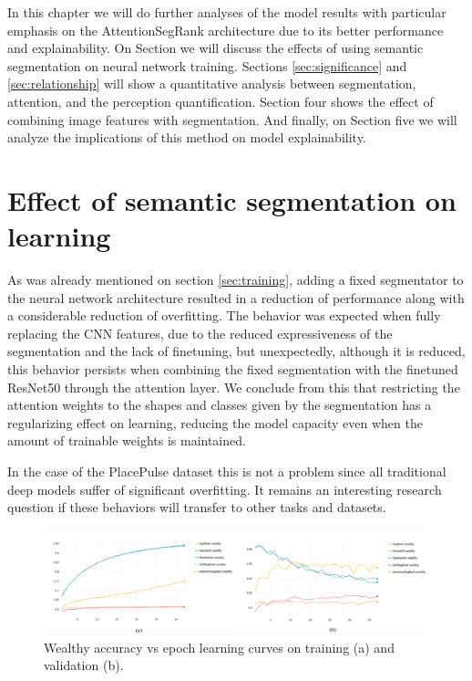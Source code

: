 In this chapter we will do further analyses of the model results with particular
emphasis on the AttentionSegRank architecture due to its better performance
and explainability. On Section \label{sec:overfit} we will discuss the effects of using semantic segmentation
on neural network  training. Sections \ref{sec:significance} and \ref{sec:relationship} will show a quantitative analysis between
segmentation, attention, and the perception quantification. Section four shows the effect of combining
image features with segmentation. And finally, on Section five we will
analyze the implications of this method on model explainability.

\section{Effect of semantic segmentation on learning}
\label{sec:overfit}
As was already mentioned on section \ref{sec:training}, adding a fixed segmentator to
the neural network architecture resulted in a reduction of performance along with a considerable
reduction of overfitting. The behavior was expected when fully replacing the CNN features,
due to the reduced expressiveness of the segmentation and the lack of finetuning, but
unexpectedly, although it is reduced, this behavior persists when combining the fixed
segmentation with the finetuned ResNet50 through the attention layer. We conclude from this
that restricting the attention weights to the shapes and classes given by the segmentation
has a regularizing effect on learning, reducing the model capacity even when the amount of trainable
weights is maintained.

In the case of the PlacePulse dataset this is not a problem since
all traditional deep models suffer of significant overfitting. It remains an interesting research
question  if these behaviors will transfer to other tasks and datasets.

\begin{figure}[ht]
	\begin{center}
	\includegraphics[width=1\textwidth]{./figures/wealthy_graph.png}
	\caption[Wealthy Training curves]{
        Wealthy accuracy vs epoch learning curves on training (a) and validation (b).
        }
	\label{fig:wealthy_graph}
	\end{center}
\end{figure}

